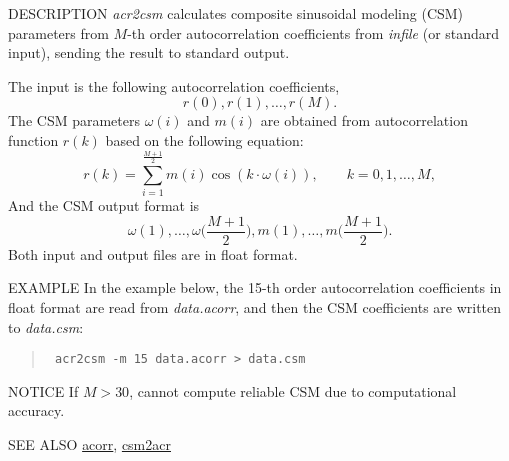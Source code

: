 \begin{synopsis}
\item [acr2csm] [ --m $M$ ] [ {\em infile} ]
\end{synopsis}

\begin{qsection}{DESCRIPTION}
{\em acr2csm} calculates composite sinusoidal modeling (CSM) parameters
from $M$-th order autocorrelation coefficients
from {\em infile} (or standard input),
sending the result to standard output.

The input is the following autocorrelation coefficients,
\begin{displaymath}
   r(0) , r(1), \dots , r(M).
\end{displaymath}
The CSM parameters $\omega(i)$ and $m(i)$ are obtained from
autocorrelation function $r(k)$ based on the following equation:
\begin{displaymath}
   r(k)=\sum_{i=1}^{\frac{M+1}{2}}m(i)\cos(k\cdot\omega(i)), \qquad k=0,1,\dots,M,
\end{displaymath}
And the CSM output format is
\begin{displaymath}
   \omega(1), \dots , \omega\biggl(\frac{M+1}{2}\biggr), m(1), \dots , m\biggl(\frac{M+1}{2}\biggr).
\end{displaymath}
Both input and output files are in float format.
\end{qsection}

\begin{options}
\end{options}

\begin{qsection}{EXAMPLE}
In the example below, the 15-th order autocorrelation coefficients in
float format are read from {\em data.acorr}, and then the CSM
coefficients are written to {\em data.csm}:
\begin{quote}
\verb! acr2csm -m 15 data.acorr > data.csm!
\end{quote}
\end{qsection}

\begin{qsection}{NOTICE}
 If $M > 30$, cannot compute reliable CSM due to computational accuracy.
\end{qsection}

\begin{qsection}{SEE ALSO}
\hyperlink{acorr}{acorr},
\hyperlink{csm2acr}{csm2acr}
\end{qsection}
